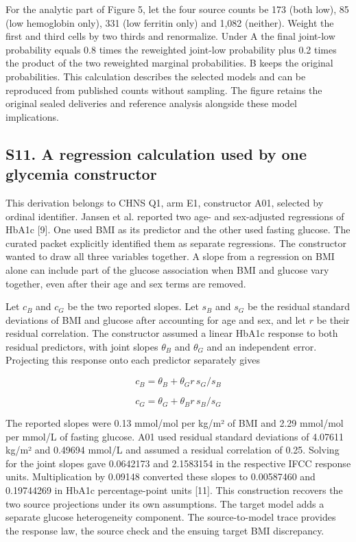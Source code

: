 \documentclass[11pt,letterpaper]{article}
\begin{document}
For the analytic part of Figure 5, let the four source counts be 173 (both low), 85 (low hemoglobin only), 331 (low ferritin only) and 1,082 (neither). Weight the first and third cells by two thirds and renormalize. Under A the final joint-low probability equals 0.8 times the reweighted joint-low probability plus 0.2 times the product of the two reweighted marginal probabilities. B keeps the original probabilities. This calculation describes the selected models and can be reproduced from published counts without sampling. The figure retains the original sealed deliveries and reference analysis alongside these model implications.


\subsection*{S11. A regression calculation used by one glycemia constructor}

This derivation belongs to CHNS Q1, arm E1, constructor A01, selected by ordinal identifier. Jansen et al. reported two age- and sex-adjusted regressions of HbA1c [9]. One used BMI as its predictor and the other used fasting glucose. The curated packet explicitly identified them as separate regressions. The constructor wanted to draw all three variables together. A slope from a regression on BMI alone can include part of the glucose association when BMI and glucose vary together, even after their age and sex terms are removed.


Let \(c_B\) and \(c_G\) be the two reported slopes. Let \(s_B\) and \(s_G\) be the residual standard deviations of BMI and glucose after accounting for age and sex, and let \(r\) be their residual correlation. The constructor assumed a linear HbA1c response to both residual predictors, with joint slopes \(\theta_B\) and \(\theta_G\) and an independent error. Projecting this response onto each predictor separately gives


\[
c_B = \theta_B + \theta_G r\,s_G/s_B
\]

\[
c_G = \theta_G + \theta_B r\,s_B/s_G
\]

The reported slopes were 0.13 mmol/\allowbreak{}mol per kg/\allowbreak{}m² of BMI and 2.29 mmol/\allowbreak{}mol per mmol/\allowbreak{}L of fasting glucose. A01 used residual standard deviations of 4.07611 kg/\allowbreak{}m² and 0.49694 mmol/\allowbreak{}L and assumed a residual correlation of 0.25. Solving for the joint slopes gave 0.0642173 and 2.1583154 in the respective IFCC response units. Multiplication by 0.09148 converted these slopes to 0.00587460 and 0.19744269 in HbA1c percentage-point units [11]. This construction recovers the two source projections under its own assumptions. The target model adds a separate glucose heterogeneity component. The source-to-model trace provides the response law, the source check and the ensuing target BMI discrepancy.
\end{document}

